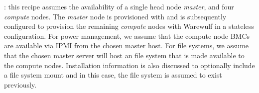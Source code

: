 : this recipe assumes the availability of a single head node
{\em master}, and four {\em compute} nodes. The {\em master} node is
provisioned with \baseOS{} and is subsequently configured to provision the
remaining {\em compute} nodes with Warewulf in a stateless configuration. For
power management, we assume that the compute node BMCs are available via IPMI
from the chosen master host. For file systems, we assume that the chosen master
server will host an \NFS{} file system that is made available to the compute
nodes. Installation information is also discussed to optionally include
a \Lustre{} file system mount and in this case, the \Lustre{} file system is
assumed to exist previously.
